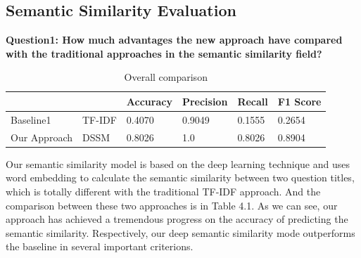 	\subsection{Semantic Similarity Evaluation}
	{\bf Question1: How much advantages the new approach have compared with the traditional approaches in the semantic similarity field?}
	\par
	\begin{table}[!h]
		\centering
		\label{tab:table6}
		\scriptsize
		\begin{tabular}{|p{2.5cm} p{1.9cm}|p{1.9cm}|p{1.9cm}|p{1.9cm}|p{1.9cm}|}
			\hline    
			& & Accuracy & Precision & Recall & F1 Score \\
			\hline
			Baseline1& TF-IDF & 0.4070  &0.9049 &0.1555 &0.2654   \\
			\hline
			{\scriptsize Our Approach}& DSSM & 0.8026  & 1.0 & 0.8026 & 0.8904\\
			\hline    
			
		\end{tabular} 
		\caption{Overall comparison}
	\end{table}	
	Our semantic similarity model is based on the deep learning technique and uses word embedding to calculate the semantic similarity between two question titles, which is totally different with the traditional TF-IDF approach. And the comparison between these two approaches is in Table 4.1. As we can see, our approach has achieved a tremendous progress on the accuracy of predicting the semantic similarity. Respectively, our deep semantic similarity mode outperforms the baseline in several important criterions.
